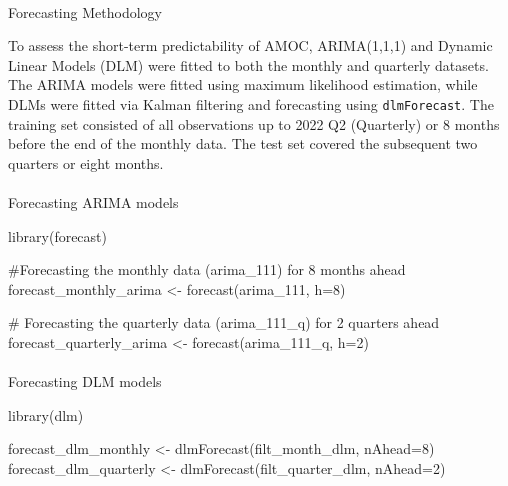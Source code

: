 \documentclass[
  11pt,
]{article}
\makeatletter
\let\oldparagraph\paragraph
\renewcommand{\paragraph}{
    \@ifstar
      \xxxParagraphStar
      \xxxParagraphNoStar
  }
\newcommand{\xxxParagraphStar}[1]{\oldparagraph*{#1}\mbox{}}
\newcommand{\xxxParagraphNoStar}[1]{\oldparagraph{#1}\mbox{}}
\newenvironment{Shaded}{\begin{snugshade}}{\end{snugshade}}
\newcommand{\AttributeTok}[1]{\textcolor[rgb]{0.40,0.45,0.13}{#1}}
\newcommand{\CommentTok}[1]{\textcolor[rgb]{0.37,0.37,0.37}{#1}}
\newcommand{\DecValTok}[1]{\textcolor[rgb]{0.68,0.00,0.00}{#1}}
\newcommand{\FunctionTok}[1]{\textcolor[rgb]{0.28,0.35,0.67}{#1}}
\newcommand{\NormalTok}[1]{\textcolor[rgb]{0.00,0.23,0.31}{#1}}
\newcommand{\OtherTok}[1]{\textcolor[rgb]{0.00,0.23,0.31}{#1}}
\makeatother
\begin{document}
\paragraph{Forecasting Methodology}\label{forecasting-methodology}

To assess the short-term predictability of AMOC, ARIMA(1,1,1) and
Dynamic Linear Models (DLM) were fitted to both the monthly and
quarterly datasets. The ARIMA models were fitted using maximum
likelihood estimation, while DLMs were fitted via Kalman filtering and
forecasting using \texttt{dlmForecast}. The training set consisted of
all observations up to 2022 Q2 (Quarterly) or 8 months before the end of
the monthly data. The test set covered the subsequent two quarters or
eight months.

\paragraph{}\label{section}

\paragraph{Forecasting ARIMA models}\label{forecasting-arima-models}

\begin{Shaded}
\begin{Highlighting}[]
\FunctionTok{library}\NormalTok{(forecast)}

\CommentTok{\#Forecasting the monthly data (arima\_111) for 8 months ahead}
\NormalTok{forecast\_monthly\_arima }\OtherTok{\textless{}{-}} \FunctionTok{forecast}\NormalTok{(arima\_111, }\AttributeTok{h=}\DecValTok{8}\NormalTok{)}

\CommentTok{\# Forecasting the quarterly data (arima\_111\_q) for 2 quarters ahead}
\NormalTok{forecast\_quarterly\_arima }\OtherTok{\textless{}{-}} \FunctionTok{forecast}\NormalTok{(arima\_111\_q, }\AttributeTok{h=}\DecValTok{2}\NormalTok{)}
\end{Highlighting}
\end{Shaded}

\paragraph{Forecasting DLM models}\label{forecasting-dlm-models}

\begin{Shaded}
\begin{Highlighting}[]
\FunctionTok{library}\NormalTok{(dlm)}

\NormalTok{forecast\_dlm\_monthly }\OtherTok{\textless{}{-}} \FunctionTok{dlmForecast}\NormalTok{(filt\_month\_dlm, }\AttributeTok{nAhead=}\DecValTok{8}\NormalTok{)}
\NormalTok{forecast\_dlm\_quarterly }\OtherTok{\textless{}{-}} \FunctionTok{dlmForecast}\NormalTok{(filt\_quarter\_dlm, }\AttributeTok{nAhead=}\DecValTok{2}\NormalTok{)}
\end{Highlighting}
\end{Shaded}
\end{document}
